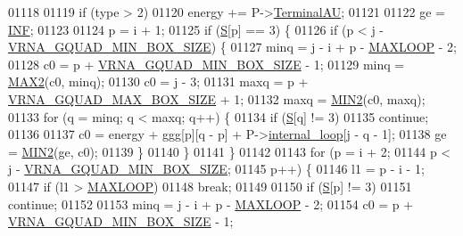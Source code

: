 \begin{DoxyCode}
01118 
01119   \textcolor{keywordflow}{if} (type > 2)
01120     energy += P->\mbox{\hyperlink{group__energy__parameters_a0ad35507a03ba7f751e82cb375e991dd}{TerminalAU}};
01121 
01122   ge = \mbox{\hyperlink{1_88_84__epars_8h_a12c2040f25d8e3a7b9e1c2024c618cb6}{INF}};
01123 
01124   p = i + 1;
01125   \textcolor{keywordflow}{if} (\mbox{\hyperlink{group__energy__parameters__rw_gga7bf2bb363bcf5ce50d60255d256e5682af1ce01387d2348f8b858721a7db81670}{S}}[p] == 3) \{
01126     \textcolor{keywordflow}{if} (p < j - \mbox{\hyperlink{group__energy__parameters_gad7bdd880afca461f97763d79ee57a347}{VRNA\_GQUAD\_MIN\_BOX\_SIZE}}) \{
01127       minq  = j - i + p - \mbox{\hyperlink{energy__const_8h_ad1bd6eabac419670ddd3c9ed82145988}{MAXLOOP}} - 2;
01128       c0    = p + \mbox{\hyperlink{group__energy__parameters_gad7bdd880afca461f97763d79ee57a347}{VRNA\_GQUAD\_MIN\_BOX\_SIZE}} - 1;
01129       minq  = \mbox{\hyperlink{group__utils_ga33297b3679c713b0c4d897cd0fe3b122}{MAX2}}(c0, minq);
01130       c0    = j - 3;
01131       maxq  = p + \mbox{\hyperlink{group__energy__parameters_ga56cafabad2f8a7db83f2d5d3b0e8d313}{VRNA\_GQUAD\_MAX\_BOX\_SIZE}} + 1;
01132       maxq  = \mbox{\hyperlink{group__utils_gae0b9cd0ce090bd69b951aa73e8fa4f7d}{MIN2}}(c0, maxq);
01133       \textcolor{keywordflow}{for} (q = minq; q < maxq; q++) \{
01134         \textcolor{keywordflow}{if} (\mbox{\hyperlink{group__energy__parameters__rw_gga7bf2bb363bcf5ce50d60255d256e5682af1ce01387d2348f8b858721a7db81670}{S}}[q] != 3)
01135           \textcolor{keywordflow}{continue};
01136 
01137         c0  = energy + ggg[p][q - p] + P->\mbox{\hyperlink{group__energy__parameters_a2a4fb2c65023ec371c9b96573da6d2fc}{internal\_loop}}[j - q - 1];
01138         ge  = \mbox{\hyperlink{group__utils_gae0b9cd0ce090bd69b951aa73e8fa4f7d}{MIN2}}(ge, c0);
01139       \}
01140     \}
01141   \}
01142 
01143   \textcolor{keywordflow}{for} (p = i + 2;
01144        p < j - \mbox{\hyperlink{group__energy__parameters_gad7bdd880afca461f97763d79ee57a347}{VRNA\_GQUAD\_MIN\_BOX\_SIZE}};
01145        p++) \{
01146     l1 = p - i - 1;
01147     \textcolor{keywordflow}{if} (l1 > \mbox{\hyperlink{energy__const_8h_ad1bd6eabac419670ddd3c9ed82145988}{MAXLOOP}})
01148       \textcolor{keywordflow}{break};
01149 
01150     \textcolor{keywordflow}{if} (\mbox{\hyperlink{group__energy__parameters__rw_gga7bf2bb363bcf5ce50d60255d256e5682af1ce01387d2348f8b858721a7db81670}{S}}[p] != 3)
01151       \textcolor{keywordflow}{continue};
01152 
01153     minq  = j - i + p - \mbox{\hyperlink{energy__const_8h_ad1bd6eabac419670ddd3c9ed82145988}{MAXLOOP}} - 2;
01154     c0    = p + \mbox{\hyperlink{group__energy__parameters_gad7bdd880afca461f97763d79ee57a347}{VRNA\_GQUAD\_MIN\_BOX\_SIZE}} - 1;

\end{DoxyCode}
